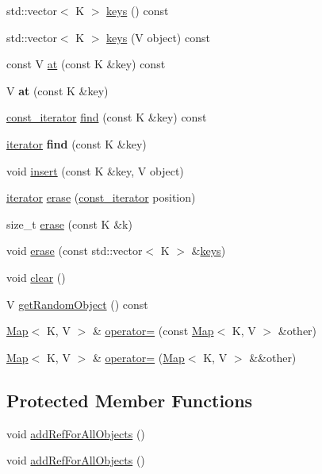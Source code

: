\begin{DoxyCompactItemize}
\item 
std\+::vector$<$ K $>$ \hyperlink{classMap_a3126580ee7336d4170fde9f53c595406}{keys} () const
\item 
std\+::vector$<$ K $>$ \hyperlink{classMap_ac01797a15562fef9b26ddc36256776e8}{keys} (V object) const
\item 
const V \hyperlink{classMap_aeeeb444bb5ab7cbb672d45c59b31086a}{at} (const K \&key) const
\item 
\mbox{\label{classMap_a991f84618e03abee54408b80892356db}} 
V {\bfseries at} (const K \&key)
\item 
\hyperlink{classMap_add90fe1e25806ba6f6278b264e78ee9a}{const\+\_\+iterator} \hyperlink{classMap_ada247c3c8f2626ef3c404922807f0b9a}{find} (const K \&key) const
\item 
\mbox{\label{classMap_a37e4c5418115e784390f70c321e0cd2d}} 
\hyperlink{classMap_ad1f372a2028b9f46497e873b0e984e84}{iterator} {\bfseries find} (const K \&key)
\item 
void \hyperlink{classMap_a79ec6300dee7b2a177fab408e9c72506}{insert} (const K \&key, V object)
\item 
\hyperlink{classMap_ad1f372a2028b9f46497e873b0e984e84}{iterator} \hyperlink{classMap_ac6710b6bb8d3a2204a88c3f6b0eee1f2}{erase} (\hyperlink{classMap_add90fe1e25806ba6f6278b264e78ee9a}{const\+\_\+iterator} position)
\item 
size\+\_\+t \hyperlink{classMap_afcbe7e6aac0b0dbad94bb1cacb4d023d}{erase} (const K \&k)
\item 
void \hyperlink{classMap_af4f0fe5e119cd47edc51dadf13d001a8}{erase} (const std\+::vector$<$ K $>$ \&\hyperlink{classMap_a3126580ee7336d4170fde9f53c595406}{keys})
\item 
void \hyperlink{classMap_a80965141d2c8dfbeb55782316130a7af}{clear} ()
\item 
V \hyperlink{classMap_a99b9731b7ca8fde6c87b3d9307039e9b}{get\+Random\+Object} () const
\item 
\hyperlink{classMap}{Map}$<$ K, V $>$ \& \hyperlink{classMap_aa4378eae3c16e838cb1654d6d99bfa0b}{operator=} (const \hyperlink{classMap}{Map}$<$ K, V $>$ \&other)
\item 
\hyperlink{classMap}{Map}$<$ K, V $>$ \& \hyperlink{classMap_af08c02bad2e780d9311a57526f0ce088}{operator=} (\hyperlink{classMap}{Map}$<$ K, V $>$ \&\&other)
\end{DoxyCompactItemize}
\subsection*{Protected Member Functions}
\begin{DoxyCompactItemize}
\item 
void \hyperlink{classMap_ac3937da982be4c236e3fdcb36cdf23f9}{add\+Ref\+For\+All\+Objects} ()
\item 
void \hyperlink{classMap_ac3937da982be4c236e3fdcb36cdf23f9}{add\+Ref\+For\+All\+Objects} ()
\end{DoxyCompactItemize}
